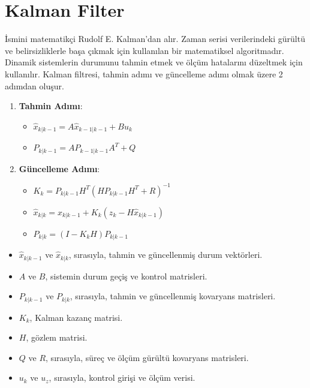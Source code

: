 \section{Kalman Filter}

İsmini matematikçi Rudolf E. Kalman'dan alır. Zaman serisi verilerindeki gürültü ve belirsizliklerle başa çıkmak için kullanılan bir matematiksel algoritmadır. Dinamik sistemlerin durumunu tahmin etmek ve ölçüm hatalarını düzeltmek için kullanılır. Kalman filtresi, tahmin adımı ve güncelleme adımı olmak üzere 2 adımdan oluşur.

\begin{enumerate}
    \item \textbf{Tahmin Adımı}:
    \begin{itemize}
        \item $\hat{x}_{k|k-1} = A \hat{x}_{k-1|k-1} + B u_k$
        \item $P_{k|k-1} = A P_{k-1|k-1} A^T + Q$
    \end{itemize}

    \item \textbf{Güncelleme Adımı}:
    \begin{itemize}
        \item $K_k = P_{k|k-1} H^T (H P_{k|k-1} H^T + R)^{-1}$
        \item $\hat{x}_{k|k} = \hat{x}_{k|k-1} + K_k (z_k - H \hat{x}_{k|k-1})$
        \item $P_{k|k} = (I - K_k H) P_{k|k-1}$
    \end{itemize}
\end{enumerate}

\begin{itemize}
    \item $\hat{x}_{k|k-1}$ ve $\hat{x}_{k|k}$, sırasıyla, tahmin ve güncellenmiş durum vektörleri.
    \item $A$ ve $B$, sistemin durum geçiş ve kontrol matrisleri.
    \item $P_{k|k-1}$ ve $P_{k|k}$, sırasıyla, tahmin ve güncellenmiş kovaryans matrisleri.
    \item $K_k$, Kalman kazanç matrisi.
    \item $H$, gözlem matrisi.
    \item $Q$ ve $R$, sırasıyla, süreç ve ölçüm gürültü kovaryans matrisleri.
    \item $u_k$ ve $u_z$, sırasıyla, kontrol girişi ve ölçüm verisi.
\end{itemize}

\newpage